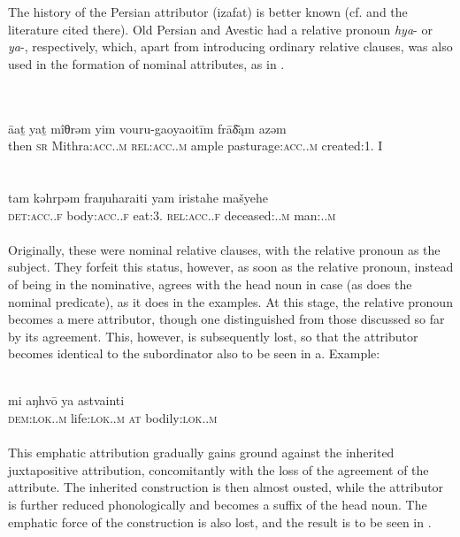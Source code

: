 The history of the Persian attributor (izafat) is better known (cf. \citealt[Ch.~\textsc{vi}.3]{Lehmann1984} and the literature cited there). Old Persian and Avestic had a relative pronoun \textit{hya}{}- or \textit{ya}{}-, respectively, which, apart from introducing ordinary relative clauses, was also used in the formation of nominal attributes, as in .

\ea\label{ex:E41}
\langinfo{\LangAvest}{}{} \\
\ea
{}\\ 
\gll \=aa\b{t}  ya\b{t}  mîθrəm  yim  vouru-gaoyaoit\=im fr\=a\={δ}\k{a}m  azəm\\
then  \textsc{sr}  Mithra:\textsc{acc}.\glsg.\textsc{m}  \textsc{rel}:\textsc{acc}.\glsg.\textsc{m}  {ample pasturage}:\textsc{acc}.\glsg.\textsc{m} {created:1.\glsg}  I\\
\\
\ex
{}\\
\gll  tam  kəhrpəm  fraŋuharaiti yam  iristahe  mašyehe\\
   \textsc{det}:\textsc{acc}.\glsg.\textsc{f}  body:\textsc{acc}.\glsg.\textsc{f}  {eat:3.\glsg}    \textsc{rel}:\textsc{acc}.\glsg.\textsc{f}  deceased:\glgen.\glsg.\textsc{m}  man:\glgen.\glsg.\textsc{m}\\
\\
\z
\z
\noindent Originally, these were nominal relative clauses, with the relative pronoun as the subject. They forfeit this status, however, as soon as the relative pronoun, instead of being in the nominative, agrees with the head noun in case (as does the nominal predicate), as it does in the examples. At this stage, the relative pronoun becomes a mere attributor, though one distinguished from those discussed so far by its agreement. This, however, is subsequently lost, so that the attributor becomes identical to the subordinator also to be seen in a. Example:

\ea\label{ex:E42}
\\
 \gll mi  aŋhv\=o  ya  astvainti\\
 \textsc{dem}:\textsc{lok}.\glsg.\textsc{m}  life:\textsc{lok}.\glsg.\textsc{m}  \textsc{at}  bodily:\textsc{lok}.\glsg.\textsc{m}\\
\\
\z
\noindent This emphatic attribution gradually gains ground against the inherited juxtapositive attribution, concomitantly with the loss of the agreement of the attribute. The inherited construction is then almost ousted, while the attributor is further reduced phonologically and becomes a suffix of the head noun. The emphatic force of the construction is also lost, and the result is to be seen in .

